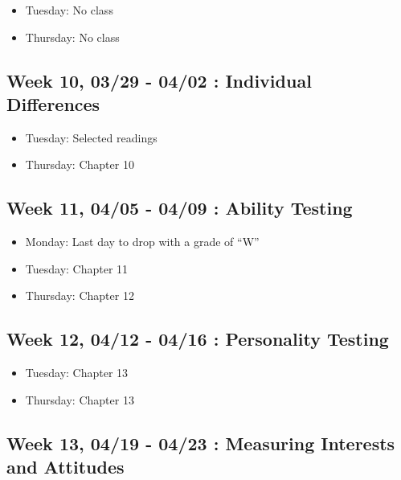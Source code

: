 \documentclass[11pt,]{article}
\providecommand{\tightlist}{%
  \setlength{\itemsep}{0pt}\setlength{\parskip}{0pt}}
\begin{document}
\begin{itemize}
\tightlist
\item
  Tuesday: No class
\item
  Thursday: No class
\end{itemize}

\hypertarget{week-10-0329---0402-individual-differences}{%
\subsection{Week 10, 03/29 - 04/02 : Individual
Differences}\label{week-10-0329---0402-individual-differences}}

\begin{itemize}
\tightlist
\item
  Tuesday: Selected readings
\item
  Thursday: Chapter 10
\end{itemize}

\hypertarget{week-11-0405---0409-ability-testing}{%
\subsection{Week 11, 04/05 - 04/09 : Ability
Testing}\label{week-11-0405---0409-ability-testing}}

\begin{itemize}
\tightlist
\item
  Monday: Last day to drop with a grade of ``W''
\item
  Tuesday: Chapter 11
\item
  Thursday: Chapter 12
\end{itemize}

\hypertarget{week-12-0412---0416-personality-testing}{%
\subsection{Week 12, 04/12 - 04/16 : Personality
Testing}\label{week-12-0412---0416-personality-testing}}

\begin{itemize}
\tightlist
\item
  Tuesday: Chapter 13
\item
  Thursday: Chapter 13
\end{itemize}

\hypertarget{week-13-0419---0423-measuring-interests-and-attitudes}{%
\subsection{Week 13, 04/19 - 04/23 : Measuring Interests and
Attitudes}\label{week-13-0419---0423-measuring-interests-and-attitudes}}
\end{document}
